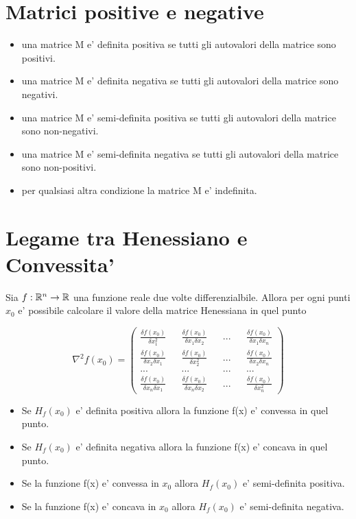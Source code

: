 \section{Matrici positive e negative}

\begin{itemize}
    \item una matrice M e' definita positiva se tutti gli autovalori della matrice sono positivi.
    \item una matrice M e' definita negativa se tutti gli autovalori della matrice sono negativi.
    \item una matrice M e' semi-definita positiva se tutti gli autovalori della matrice sono non-negativi.
    \item una matrice M e' semi-definita negativa se tutti gli autovalori della matrice sono non-positivi.
    \item per qualsiasi altra condizione la matrice M e' indefinita.
\end{itemize}

\section{Legame tra Henessiano e Convessita'}

Sia $f : \mathbb{R}^n \rightarrow \mathbb{R}$ una funzione reale due volte differenzialbile. Allora per ogni punti $x_0$ e' possibile calcolare il valore della matrice Henessiana in quel punto

\[
    \nabla^2 f(x_0) =
    \begin{pmatrix}
        \frac {\delta f(x_0)} {\delta x_1^2} && \frac {\delta f(x_0)} {\delta x_1 \delta x_2} && ... && \frac {\delta f(x_0)} {\delta x_1 \delta x_n} \\
        \frac {\delta f(x_0)} {\delta x_2 \delta x_1} && \frac {\delta f(x_0)} {\delta x_2^2} && ... && \frac {\delta f(x_0)} {\delta x_2 \delta x_n} \\
        ... && ... && ... && ... \\
        \frac {\delta f(x_0)} {\delta x_n \delta x_1} && \frac {\delta f(x_0)} {\delta x_n \delta x_2} && ... && \frac {\delta f(x_0)} {\delta x_n^2}
    \end{pmatrix}
\]

\begin{itemize}
    \item Se $H_f(x_0)$ e' definita positiva allora la funzione f(x) e' convessa in quel punto.
    \item Se $H_f(x_0)$ e' definita negativa allora la funzione f(x) e' concava in quel punto.
    \item Se la funzione f(x) e' convessa in $x_0$ allora $H_f(x_0)$ e' semi-definita positiva.
    \item Se la funzione f(x) e' concava in $x_0$ allora $H_f(x_0)$ e' semi-definita negativa.
\end{itemize}

